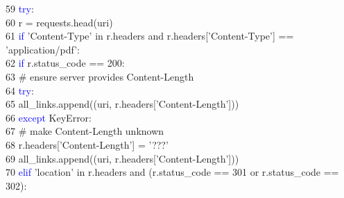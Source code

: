 59	 \hspace*{5mm}        \hspace*{10mm}\textcolor{blue}{try}:\\
60	 \hspace*{5mm}            \hspace*{15mm}r = requests.head(uri)\\
61	 \hspace*{5mm}            \hspace*{15mm}\textcolor{blue}{if} 'Content-Type' in r.headers and r.headers['Content-Type'] == 'application/pdf':\\
62	 \hspace*{5mm}                \hspace*{20mm}\textcolor{blue}{if} r.status\_code == 200:\\
63	 \hspace*{5mm}                    \hspace*{25mm}\# ensure server provides Content-Length\\
64	 \hspace*{5mm}                    \hspace*{25mm}\textcolor{blue}{try}:\\
65	 \hspace*{5mm}                        \hspace*{30mm}all\_links.append((uri, r.headers['Content-Length']))\\
66	 \hspace*{5mm}                    \hspace*{25mm}\textcolor{blue}{except} KeyError:\\
67	 \hspace*{5mm}                        \hspace*{30mm}\# make Content-Length unknown\\
68	 \hspace*{5mm}                        \hspace*{30mm}r.headers['Content-Length'] = '???'\\
69	 \hspace*{5mm}                        \hspace*{30mm}all\_links.append((uri, r.headers['Content-Length']))\\
70	 \hspace*{5mm}                \hspace*{20mm}\textcolor{blue}{elif} 'location' in r.headers and (r.status\_code == 301 or r.status\_code == 302):\\
